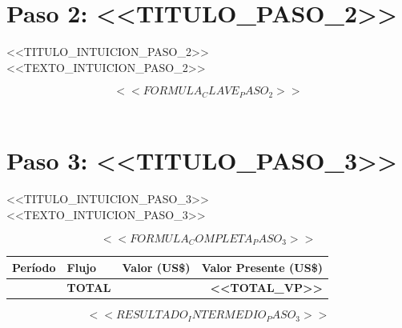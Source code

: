 \documentclass[12pt,a4paper]{article}
\begin{document}
\vspace{1cm}

\section{Paso 2: <<TITULO_PASO_2>>}

\begin{cajaintuicion}{<<TITULO_INTUICION_PASO_2>>}
<<TEXTO_INTUICION_PASO_2>>
\end{cajaintuicion}

\begin{cajaformula}
\[
<<FORMULA_CLAVE_PASO_2>>
\]
\end{cajaformula}

\begin{align}
\end{align}

\vspace{1cm}

\section{Paso 3: <<TITULO_PASO_3>>}

\begin{cajaintuicion}{<<TITULO_INTUICION_PASO_3>>}
<<TEXTO_INTUICION_PASO_3>>
\end{cajaintuicion}

\[
<<FORMULA_COMPLETA_PASO_3>>
\]

\begin{center}
\begin{tabular}{clrr}
\toprule
\textbf{Per\'iodo} & \textbf{Flujo} & \textbf{Valor (US\$)} & \textbf{Valor Presente (US\$)} \\
\midrule
\midrule
 & \textbf{TOTAL} & & \textbf{<<TOTAL_VP>>} \\
\bottomrule
\end{tabular}
\end{center}

\[
\boxed{<<RESULTADO_INTERMEDIO_PASO_3>>}
\]
\end{document}
